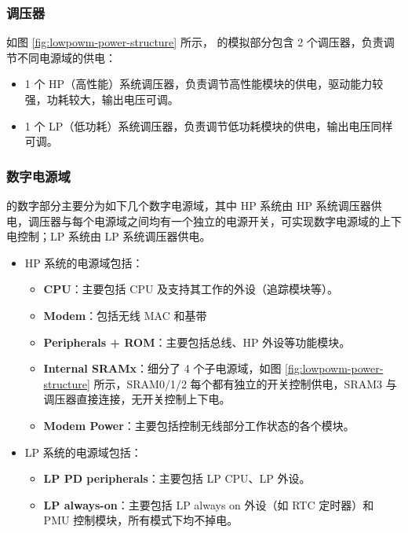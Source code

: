 \documentclass[main\_\_CN.tex]{subfiles}
\begin{document}
\subsubsection{调压器}\label{sec:lowpowm-regulators}

如图 \ref{fig:lowpowm-power-structure} 所示，\chipname{} 的模拟部分包含 2 个调压器，负责调节不同电源域的供电：

\begin{itemize}
    \item 1 个 HP（高性能）系统调压器，负责调节高性能模块的供电，驱动能力较强，功耗较大，输出电压可调。
    \item 1 个 LP（低功耗）系统调压器，负责调节低功耗模块的供电，输出电压同样可调。
\end{itemize}


\subsubsection{数字电源域}\label{sec:lowpowm_digital_domain}

\chipname{} 的数字部分主要分为如下几个数字电源域，其中 HP 系统由 HP 系统调压器供电，调压器与每个电源域之间均有一个独立的电源开关，可实现数字电源域的上下电控制；LP 系统由 LP 系统调压器供电。

\begin{itemize}
    \item HP 系统的电源域包括：
    \begin{itemize}
        \item \textbf{CPU}：主要包括 CPU 及支持其工作的外设（追踪模块等）。
        \item \textbf{Modem}：包括无线 MAC 和基带
        \item \textbf{Peripherals + ROM}：主要包括总线、HP 外设等功能模块。

        \item \textbf{Internal SRAMx}：细分了 4 个子电源域，如图 \ref{fig:lowpowm-power-structure} 所示，SRAM0/1/2 每个都有独立的开关控制供电，SRAM3 与调压器直接连接，无开关控制上下电。
        \item \textbf{Modem Power}：主要包括控制无线部分工作状态的各个模块。
    \end{itemize}
    \item LP 系统的电源域包括：
    \begin{itemize}
        \item \textbf{LP PD peripherals}：主要包括 LP CPU、LP 外设。
        \item \textbf{LP always-on}：主要包括 LP always on 外设（如 RTC 定时器）和 PMU 控制模块，所有模式下均不掉电。
    \end{itemize}
\end{itemize}
\end{document}
